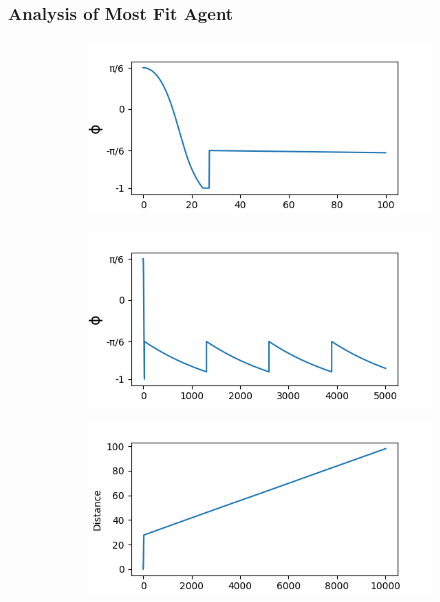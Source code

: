 \documentclass{article}
\begin{document}
\subsubsection{Analysis of Most Fit Agent}

\begin{figure}[htbp]
  \centering
  \begin{subfigure}[b]{0.32\textwidth}
    \centering
    \includegraphics[width=\textwidth]{../plots/angleTime1_170.png}
    \caption{}
    \label{fig:angleTimePlot1Best}
  \end{subfigure}
  \begin{subfigure}[b]{0.32\textwidth}
    \centering
    \includegraphics[width=\textwidth]{../plots/angleTime1_170_LONG.png}
    \caption{}
    \label{fig:angleTimePlot1BestLong}
  \end{subfigure}
  \begin{subfigure}[b]{0.32\textwidth}
    \centering
    \includegraphics[width=\textwidth]{../plots/dist_170_LONG_X.png}

\end{subfigure}
\end{figure}
\end{document}
